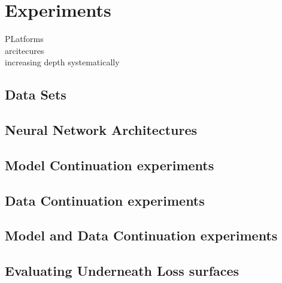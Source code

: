\chapter{Experiments}

PLatforms \\

arcitecures \\ 

increasing depth systematically \\

\section{Data Sets}

\section{Neural Network Architectures}


\section{Model Continuation experiments}


\section{Data Continuation experiments}


\section{Model and Data Continuation experiments}


\section{Evaluating Underneath Loss surfaces}


